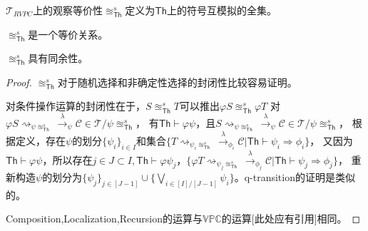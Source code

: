 \begin{definition}
   $\mathcal{T}_{RVPC}$上的观察等价性$\approxeq^s_{\mathsf{Th}}$定义为$\mathsf{Th}$上的符号互模拟的全集。
\end{definition}

\begin{theorem}
   $\approxeq^s_{\mathsf{Th}}$是一个等价关系。
\end{theorem}

\begin{theorem}
   $\approxeq^s_{\mathsf{Th}}$具有同余性。
\end{theorem}
\begin{proof}
   $\approxeq^s_{\mathsf{Th}}$对于随机选择和非确定性选择的封闭性比较容易证明。

对条件操作运算的封闭性在于，$S\approxeq^s_{\mathsf{Th}} T$可以推出$\varphi S \approxeq^s_{\mathsf{Th}} \varphi T$
对$\varphi S\rightsquigarrow_{\psi \approxeq^s_{\mathsf{Th}}}\stackrel{\lambda}{\rightarrow}_{\psi} \mathcal{C}\in \mathcal{T}/\psi \approxeq^s_{\mathsf{Th}}$，
有$\mathsf{Th}\vdash \varphi\psi$，且$S\rightsquigarrow_{\psi \approxeq^s_{\mathsf{Th}}}\stackrel{\lambda}{\rightarrow}_{\psi} \mathcal{C}\in \mathcal{T}/\psi \approxeq^s_{\mathsf{Th}}$，
根据定义，存在$\psi$的划分$\{\psi_i\}_{i\in I}$和集合$\{T\rightsquigarrow_{\psi_i \approxeq^s_{\mathsf{Th}}}\stackrel{\lambda}{\rightarrow}_{\phi_i}\mathcal{C}|\mathsf{Th}\vdash \psi_i\Rightarrow\phi_i\}$，
又因为$\mathsf{Th}\vdash \varphi\psi$，所以存在$j\in J\subset I, \mathsf{Th}\vdash \varphi\psi_j$，$\{\varphi T\rightsquigarrow_{\psi_j \approxeq^s_{\mathsf{Th}}}\stackrel{\lambda}{\rightarrow}_{\phi_j}\mathcal{C}|\mathsf{Th}\vdash \psi_j\Rightarrow\phi_j\}$，
重新构造$\psi$的划分为$\{\psi_j\}_{j\in [J-1]}\cup \{\bigvee_{i\in [I]/[J-1]}\psi_i\}$。q-transition的证明是类似的。

Composition,Localization,Recursion的运算与$\mathbb{VPC}$的运算[此处应有引用]相同。
\end{proof}